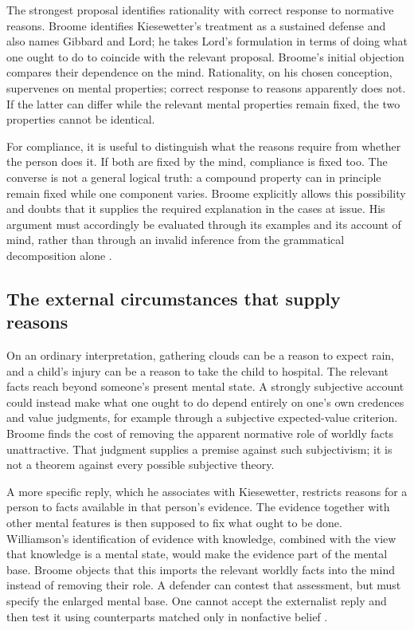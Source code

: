 The strongest proposal identifies rationality with correct response to
normative reasons. Broome identifies Kiesewetter's treatment as a sustained
defense and also names Gibbard and Lord; he takes Lord's formulation in
terms of doing what one ought to do to coincide with the relevant proposal.
Broome's initial objection compares their dependence on
the mind. Rationality, on his chosen conception, supervenes on mental
properties; correct response to reasons apparently does not. If the latter
can differ while the relevant mental properties remain fixed, the two
properties cannot be identical.

For compliance, it is useful to distinguish what the reasons require from
whether the person does it. If both are fixed by the mind, compliance is
fixed too. The converse is not a general logical truth: a compound property
can in principle remain fixed while one component varies. Broome explicitly
allows this possibility and doubts that it supplies the required explanation
in the cases at issue. His argument must accordingly be evaluated through
its examples and its account of mind, rather than through an invalid inference
from the grammatical decomposition alone
\parencite[pp.~131--132 and p.~135, nn.~6--8]{Broome2021ReasonsRationality}.

\subsection{The external circumstances that supply reasons}

On an ordinary interpretation, gathering clouds can be a reason to expect
rain, and a child's injury can be a reason to take the child to hospital.
The relevant facts reach beyond someone's present mental state. A strongly
subjective account could instead make what one ought to do depend entirely
on one's own credences and value judgments, for example through a subjective
expected-value criterion. Broome finds the cost of removing the apparent
normative role of worldly facts unattractive. That judgment supplies a
premise against such subjectivism; it is not a theorem against every possible
subjective theory.

A more specific reply, which he associates with Kiesewetter, restricts reasons
for a person to facts available in that person's evidence. The evidence
together with other mental features is then supposed to fix what ought to be
done. Williamson's identification of evidence with knowledge, combined with
the view that knowledge is a mental state, would make the evidence part of
the mental base. Broome objects that this imports the relevant worldly facts
into the mind instead of removing their role. A defender can contest that
assessment, but must specify the enlarged mental base. One cannot accept the
externalist reply and then test it using counterparts matched only in
nonfactive belief
\parencite[p.~132]{Broome2021ReasonsRationality}.

